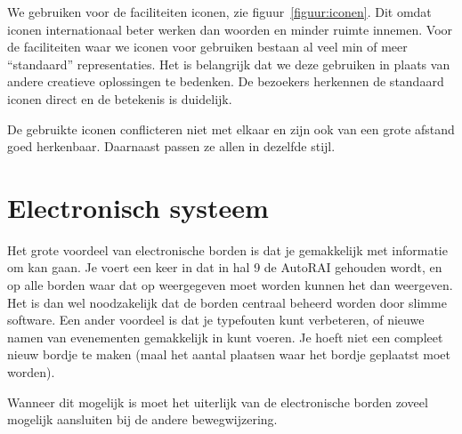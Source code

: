 We gebruiken voor de faciliteiten iconen, zie figuur~\ref{figuur:iconen}. Dit omdat iconen internationaal beter werken dan woorden en minder ruimte innemen. Voor de faciliteiten waar we iconen voor gebruiken bestaan al veel min of meer ``standaard'' representaties. Het is belangrijk dat we deze gebruiken in plaats van andere creatieve oplossingen te bedenken. De bezoekers herkennen de standaard iconen direct en de betekenis is duidelijk.

De gebruikte iconen conflicteren niet met elkaar en zijn ook van een grote afstand goed herkenbaar. Daarnaast passen ze allen in dezelfde stijl.


\section{Electronisch systeem}

Het grote voordeel van electronische borden is dat je gemakkelijk met informatie om kan gaan. Je voert een keer in dat in hal 9 de AutoRAI gehouden wordt, en op alle borden waar dat op weergegeven moet worden kunnen het dan weergeven. Het is dan wel noodzakelijk dat de borden centraal beheerd worden door slimme software.
Een ander voordeel is dat je typefouten kunt verbeteren, of nieuwe namen van evenementen gemakkelijk in kunt voeren. Je hoeft niet een compleet nieuw bordje te maken (maal het aantal plaatsen waar het bordje geplaatst moet worden).

Wanneer dit mogelijk is moet het uiterlijk van de electronische borden zoveel mogelijk aansluiten bij de andere bewegwijzering.
